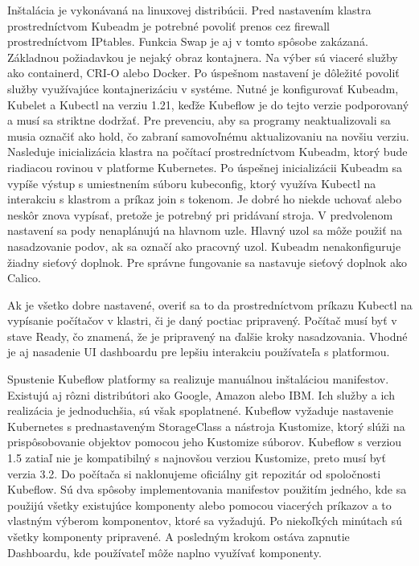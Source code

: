Inštalácia je vykonávaná na linuxovej distribúcii. Pred nastavením klastra prostredníctvom Kubeadm je potrebné povoliť prenos cez firewall prostredníctvom IPtables. Funkcia Swap je aj v tomto spôsobe zakázaná. Základnou požiadavkou je nejaký obraz kontajnera. Na výber sú viaceré služby ako containerd, CRI-O alebo Docker. Po úspešnom nastavení je dôležité povoliť služby využívajúce kontajnerizáciu v systéme. Nutné je konfigurovať Kubeadm, Kubelet a Kubectl na verziu 1.21, keďže Kubeflow je do tejto verzie podporovaný a musí sa striktne dodržať. Pre prevenciu, aby sa programy neaktualizovali sa musia označiť ako hold, čo zabraní samovoľnému aktualizovaniu na novšiu verziu. Nasleduje inicializácia klastra na počítací prostredníctvom Kubeadm, ktorý bude riadiacou rovinou v platforme Kubernetes. Po úspešnej inicializácii Kubeadm sa vypíše výstup s umiestnením súboru kubeconfig, ktorý využíva Kubectl na interakciu s klastrom a príkaz join s tokenom. Je dobré ho niekde uchovať alebo neskôr znova vypísať, pretože je potrebný pri pridávaní stroja. V predvolenom nastavení sa pody nenaplánujú na hlavnom uzle. Hlavný uzol sa môže použiť na nasadzovanie podov, ak sa označí ako pracovný uzol. Kubeadm nenakonfiguruje žiadny sieťový doplnok. Pre správne fungovanie sa nastavuje sieťový doplnok ako Calico.

Ak je všetko dobre nastavené, overiť sa to da prostredníctvom príkazu Kubectl na vypísanie počítačov v klastri, či je daný poctiac pripravený. Počítač musí byť v stave Ready, čo znamená, že je pripravený na ďalšie kroky nasadzovania. Vhodné je aj nasadenie UI dashboardu pre lepšiu interakciu používateľa s platformou.

Spustenie Kubeflow platformy sa realizuje manuálnou inštaláciou manifestov. Existujú aj rôzni distribútori ako Google, Amazon alebo IBM. Ich služby a ich realizácia je jednoduchšia, sú však spoplatnené. Kubeflow vyžaduje nastavenie Kubernetes s prednastaveným StorageClass a nástroja Kustomize, ktorý slúži na prispôsobovanie objektov pomocou jeho Kustomize súborov. Kubeflow s verziou 1.5 zatiaľ nie je kompatibilný s najnovšou verziou Kustomize, preto musí byť verzia 3.2. Do počítača si naklonujeme oficiálny git repozitár od spoločnosti Kubeflow. Sú dva spôsoby implementovania manifestov použitím jedného, kde sa použijú všetky existujúce komponenty alebo pomocou viacerých príkazov a to vlastným výberom komponentov, ktoré sa vyžadujú. Po niekoľkých minútach sú všetky komponenty pripravené. A posledným krokom ostáva zapnutie Dashboardu, kde používateľ môže naplno využívať komponenty.

